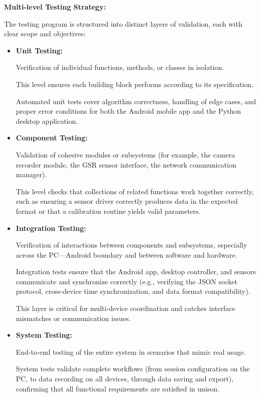 \textbf{Multi-level Testing Strategy:}

The testing program is structured into distinct layers of validation, each with clear
scope and objectives: \begin{itemize}

\item \textbf{Unit Testing:}

Verification of individual functions, methods, or classes in isolation.

This level ensures each building block performs according to its specification.

Automated unit tests cover algorithm correctness, handling of edge cases, and proper
error conditions for both the Android mobile app and the Python desktop application.

\item \textbf{Component Testing:}

Validation of cohesive modules or subsystems (for example, the camera recorder
module, the GSR sensor interface, the network communication manager).

This level checks that collections of related functions work together correctly, such
as ensuring a sensor driver correctly produces data in the expected format or that a
calibration routine yields valid parameters.

\item \textbf{Integration Testing:}

Verification of interactions between components and subsystems, especially across the
PC---Android boundary and between software and hardware.

Integration tests ensure that the Android app, desktop controller, and sensors
communicate and synchronize correctly (e.g., verifying the JSON socket protocol,
cross-device time synchronization, and data format compatibility).

This layer is critical for multi-device coordination and catches interface mismatches
or communication issues.

\item \textbf{System Testing:}

End-to-end testing of the entire system in scenarios that mimic real usage.

System tests validate complete workflows (from session configuration on the PC, to
data recording on all devices, through data saving and export), confirming that all
functional requirements are satisfied in unison.


\end{itemize}
